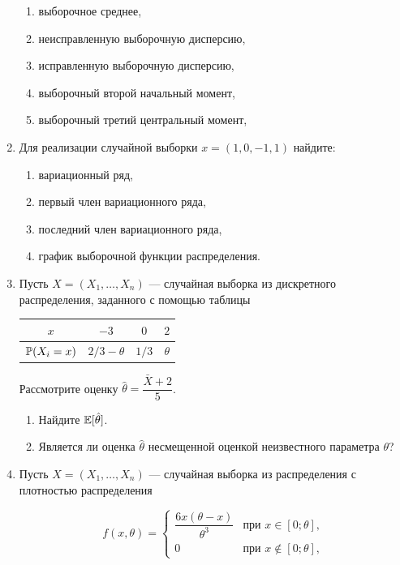 \begin{enumerate}
\begin{enumerate}
\item выборочное среднее,
\item неисправленную выборочную дисперсию,
\item исправленную выборочную дисперсию,
\item выборочный второй начальный момент,
\item выборочный третий центральный момент,
\end{enumerate}

\item Для реализации случайной выборки $x=(1,0,-1,1)$ найдите:

\begin{enumerate}
\item вариационный ряд,
\item первый член вариационного ряда,
\item последний член вариационного ряда,
\item график выборочной функции распределения.
\end{enumerate}

\item Пусть $X=(X_1, \ldots,X_n)$ — случайная выборка из дискретного распределения, заданного с помощью таблицы

\begin{center}
\begin{tabular}{cccc}
\toprule
 $x$ & $-3$  &$ 0 $  & $2 $  \\
 \midrule
 $\P(X_i = x)$ & $2/3 - \theta$ & $1/3$ & $\theta$ \\
 \bottomrule
\end{tabular}
\end{center}

Рассмотрите оценку $\hat{\theta} = \dfrac{\bar{X}+2}{5}$.

\begin{enumerate}
    \item Найдите $\E[\hat{\theta}]$.
    \item Является ли оценка $\hat{\theta}$ несмещенной оценкой неизвестного параметра $\theta$?
\end{enumerate}

\item Пусть $X=(X_1, \ldots ,X_n)$ — случайная выборка из распределения с плотностью распределения

\[
f(x,\theta) = \begin{cases}
\dfrac{6x(\theta - x)}{\theta^3} & \text{при } x \in [0;\theta], \\
0 & \text{при } x \not\in [0;\theta],
\end{cases}
\]



\end{enumerate}
